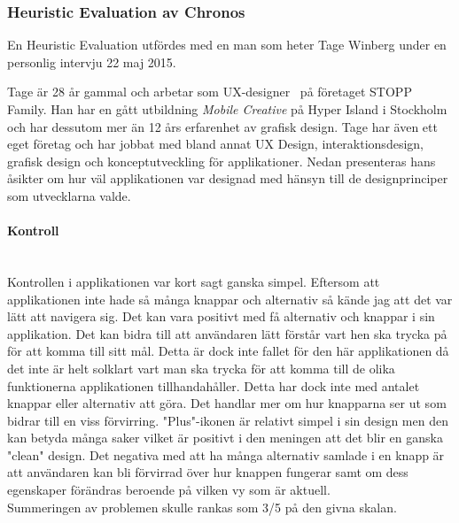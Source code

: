 \documentclass[a4paper, 11pt]{article}
\begin{document}
\subsubsection{Heuristic Evaluation av Chronos}
En Heuristic Evaluation utfördes med en man som heter Tage Winberg under en personlig intervju 22 maj 2015. 

Tage är 28 år gammal och arbetar som UX-designer~\cite{uxdesign} på företaget STOPP Family. Han har en gått utbildning \textit{Mobile Creative} på Hyper Island i Stockholm och har dessutom mer än 12 års erfarenhet av grafisk design. Tage har även ett eget företag och har jobbat med bland annat UX Design, interaktionsdesign, grafisk design och konceptutveckling för applikationer.
Nedan presenteras hans åsikter om hur väl applikationen var designad med hänsyn till de designprinciper som utvecklarna valde.

\paragraph{Kontroll}\mbox{}\\
Kontrollen i applikationen var kort sagt ganska simpel. Eftersom att applikationen inte hade så många knappar och alternativ så kände jag att det var lätt att navigera sig. Det kan vara positivt med få alternativ och knappar i sin applikation. Det kan bidra till att användaren lätt förstår vart hen ska trycka på för att komma till sitt mål. Detta är dock inte fallet för den här applikationen då det inte är helt solklart vart man ska trycka för att komma till de olika funktionerna applikationen tillhandahåller. Detta har dock inte med antalet knappar eller alternativ att göra. Det handlar mer om hur knapparna ser ut som bidrar till en viss förvirring.
"Plus"-ikonen är relativt simpel i sin design men den kan betyda många saker vilket är positivt i den meningen att det blir en ganska "clean" design. Det negativa med att ha många alternativ samlade i en knapp är att användaren kan bli förvirrad över hur knappen fungerar samt om dess egenskaper förändras beroende på vilken vy som är aktuell.\\
Summeringen av problemen skulle rankas som 3/5 på den givna skalan.
\end{document}
